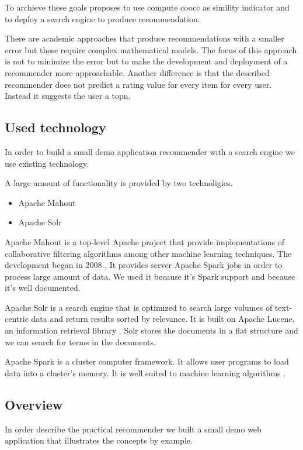To archieve these goals \cite{Dunning14} proposes to use compute \gls{coocc} as simility indicator and to deploy a search engine to produce recommendation.

There are academic approaches that produce recommendations with a smaller error but these require complex mathematical models. The focus of this approach is not to minimize the error but to make the development and deployment of a recommender more approachable. Another difference is that the described recommender does not predict a rating value for every item for every user. Instead it suggests the user a \gls{topn}.


\subsection{Used technology}
\label{sec:tech}

In order to build a small demo application recommender with a search engine we use existing technology.

A large amount of functionality is provided by two technoligies.
\begin{itemize}
\item Apache Mahout
\item Apache Solr
\end{itemize}

Apache Mahout is a top-level Apache project that provide implementations of collaborative filtering algorithms among other machine learning techniques. The development began in 2008 \cite{Owen}. It provides server Apache Spark jobs in order to process large amount of data. We used it because it's Spark support and because it's well documented.

Apache Solr is a search engine that is optimized to search large volumes of text-centric data and return results sorted by relevance. It is built on Apache Lucene, an information retrieval library \cite{grainger}. Solr stores the documents in a flat structure and we can search for terms in the documents.

Apache Spark is a cluster computer framework. It allows user programs to load data into a cluster's memory. It is well suited to machine learning algorithms \cite{Karau}.

\subsection{Overview}

In order describe the practical recommender we built a small demo web application that illustrates the concepts by example.

